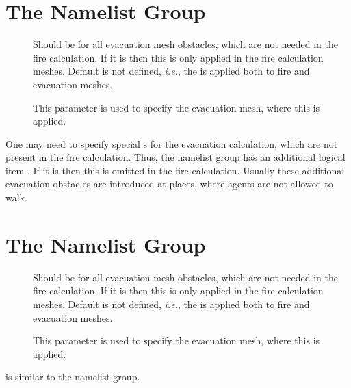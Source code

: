 \documentclass[12pt,a4paper,final,twoside]{stylevk}
\begin{document}
\section{The  Namelist Group}\label{Sec_ObstNML}

\begin{description}
%
\item[] Should be  for all evacuation
  mesh obstacles, which are not needed in the fire calculation.  If it
  is  then this  is only applied in the
  fire calculation meshes.  Default is not defined, \emph{i.e.}, the
   is applied both to fire and evacuation meshes.
%
\item[] This parameter is used to specify the
  evacuation mesh, where this  is applied.
%
\end{description}

One may need to specify special s for the evacuation
calculation, which are not present in the fire calculation.  Thus, the
 namelist group has an additional logical item
.  If it is  then this  is
omitted in the fire calculation.  Usually these additional evacuation
obstacles are introduced at places, where agents are not allowed to
walk.  


\section{The  Namelist Group}\label{Sec_HoleNML}

\begin{description}
%
\item[] Should be  for all evacuation
  mesh obstacles, which are not needed in the fire calculation.  If it
  is  then this  is only applied in the
  fire calculation meshes.  Default is not defined, \emph{i.e.}, the
   is applied both to fire and evacuation meshes.
%
\item[] This parameter is used to specify the
  evacuation mesh, where this  is applied.
%
\end{description}

 is similar to the  namelist group.  
\end{document}
